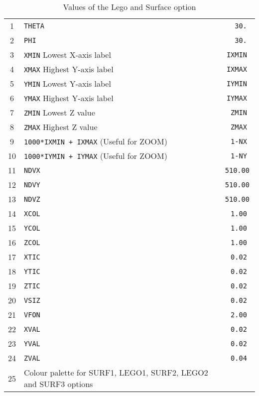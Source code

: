 \begin{table}[p]
\begin{center}
\begin{tabular}{||c|p{11cm}|>{\tt}r||}
\hline
1  & {\tt THETA}                                                    &   30.   \\
2  & {\tt PHI}                                                      &   30.   \\
3  & {\tt XMIN} Lowest X-axis label                                 &   IXMIN \\
4  & {\tt XMAX} Highest Y-axis label                                &   IXMAX \\
5  & {\tt YMIN} Lowest Y-axis label                                 &   IYMIN \\
6  & {\tt YMAX} Highest Y-axis label                                &   IYMAX \\
7  & {\tt ZMIN} Lowest Z value                                      &   ZMIN  \\
8  & {\tt ZMAX} Highest Z value                                     &   ZMAX  \\
9  & {\tt 1000*IXMIN + IXMAX} (Useful for ZOOM)                     &   1-NX  \\
10 & {\tt 1000*IYMIN + IYMAX} (Useful for ZOOM)                     &   1-NY  \\
11 & {\tt NDVX}                                                     &  510.00 \\
12 & {\tt NDVY}                                                     &  510.00 \\
13 & {\tt NDVZ}                                                     &  510.00 \\
14 & {\tt XCOL}                                                     &    1.00 \\
15 & {\tt YCOL}                                                     &    1.00 \\
16 & {\tt ZCOL}                                                     &    1.00 \\
17 & {\tt XTIC}                                                     &    0.02 \\
18 & {\tt YTIC}                                                     &    0.02 \\
19 & {\tt ZTIC}                                                     &    0.02 \\
20 & {\tt VSIZ}                                                     &    0.02 \\
21 & {\tt VFON}                                                     &    2.00 \\
22 & {\tt XVAL}                                                     &    0.02 \\
23 & {\tt YVAL}                                                     &    0.02 \\
24 & {\tt ZVAL}                                                     &    0.04 \\
25 & Colour palette for SURF1, LEGO1, SURF2, LEGO2 and SURF3 options &        \\
\hline
\end{tabular}
\end{center}
\caption{Values of the \protect{} Lego and Surface option}
\label{tab-IGTABLS}
\end{table}

